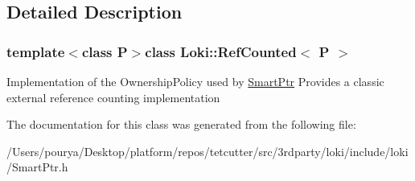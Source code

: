\subsection{Detailed Description}
\subsubsection*{template$<$class P$>$class Loki\+::\+Ref\+Counted$<$ P $>$}

Implementation of the Ownership\+Policy used by \hyperlink{classLoki_1_1SmartPtr}{Smart\+Ptr} Provides a classic external reference counting implementation 

The documentation for this class was generated from the following file\+:\begin{DoxyCompactItemize}
\item 
/\+Users/pourya/\+Desktop/platform/repos/tetcutter/src/3rdparty/loki/include/loki/Smart\+Ptr.\+h\end{DoxyCompactItemize}
